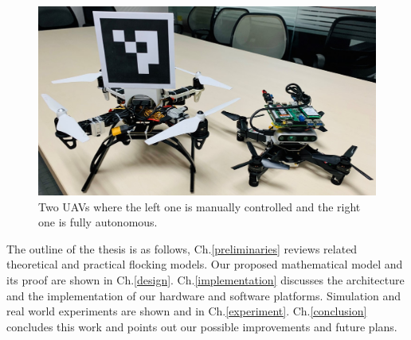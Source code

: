 \begin{figure}[htb]
  \centering
  \includegraphics[width=1\textwidth]{figure/chapter_1/twin.jpg}
  \caption{Two UAVs where the left one is manually controlled and the right one is fully autonomous.}
  \label{fig:twin}
\end{figure}

The outline of the thesis is as follows, Ch.\ref{preliminaries} reviews related theoretical and practical flocking models. Our proposed mathematical model and its proof are shown in Ch.\ref{design}. Ch.\ref{implementation} discusses the architecture and the implementation of our hardware and software platforms. Simulation and real world experiments are shown and in Ch.\ref{experiment}. Ch.\ref{conclusion} concludes this work and points out our possible improvements and future plans.

\newpage
